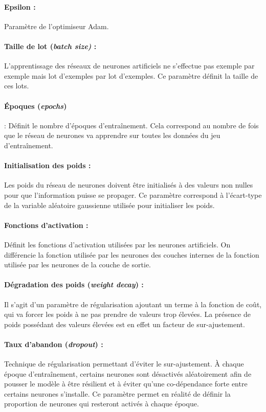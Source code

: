 \paragraph{Epsilon : } Paramètre de l'optimiseur Adam.

\paragraph{Taille de lot (\emph{batch size)} :} L'apprentissage des réseaux de neurones artificiels ne s'effectue pas exemple par exemple mais lot d'exemples par lot d'exemples. Ce paramètre définit la taille de ces lots.

\paragraph{Époques (\emph{epochs})} : Définit le nombre d'époques d'entraînement. Cela correspond au nombre de fois que le réseau de neurones va apprendre sur toutes les données du jeu d'entraînement.

\paragraph{Initialisation des poids : } Les poids du réseau de neurones doivent être initialisés à des valeurs non nulles pour que l'information puisse se propager. Ce paramètre correspond à l'écart-type de la variable aléatoire gaussienne utilisée pour initialiser les poids.

\paragraph{Fonctions d'activation : } Définit les fonctions d'activation utilisées par les neurones artificiels. On différencie la fonction utilisée par les neurones des couches internes de la fonction utilisée par les neurones de la couche de sortie.

\paragraph{Dégradation des poids (\emph{weight decay}) : } Il s'agit d'un paramètre de régularisation ajoutant un terme à la fonction de coût, qui va forcer les poids à ne pas prendre de valeurs trop élevées. La présence de poids possédant des valeurs élevées est en effet un facteur de sur-ajustement\cite{weight_decay}.

\paragraph{Taux d'abandon (\emph{dropout}) : } Technique de régularisation permettant d'éviter le sur-ajustement. À chaque époque d'entraînement, certains neurones sont désactivés aléatoirement afin de pousser le modèle à être résilient et à éviter qu'une co-dépendance forte entre certains neurones s'installe. Ce paramètre permet en réalité de définir la proportion de neurones qui resteront activés à chaque époque.



